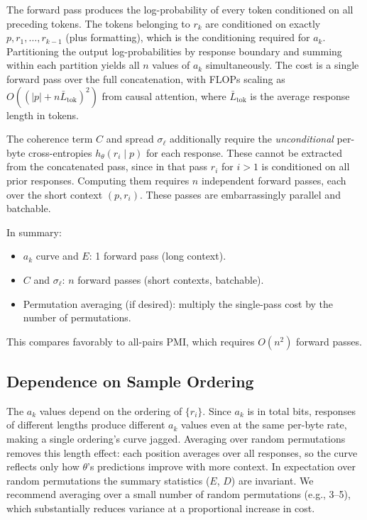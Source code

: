 \documentclass[11pt]{article}
\begin{document}
The forward pass produces the log-probability of every token conditioned on all preceding tokens. The tokens belonging to $r_k$ are conditioned on exactly $p, r_1, \ldots, r_{k-1}$ (plus formatting), which is the conditioning required for $a_k$. Partitioning the output log-probabilities by response boundary and summing within each partition yields all $n$ values of $a_k$ simultaneously. The cost is a single forward pass over the full concatenation, with FLOPs scaling as $O((|p| + n\bar{L}_{\mathrm{tok}})^2)$ from causal attention, where $\bar{L}_{\mathrm{tok}}$ is the average response length in tokens.

The coherence term $C$ and spread $\sigma_\ell$ additionally require the \emph{unconditional} per-byte cross-entropies $h_\theta(r_i \mid p)$ for each response. These cannot be extracted from the concatenated pass, since in that pass $r_i$ for $i > 1$ is conditioned on all prior responses. Computing them requires $n$ independent forward passes, each over the short context $(p, r_i)$. These passes are embarrassingly parallel and batchable.

In summary:
\begin{itemize}[nosep]
    \item $a_k$ curve and $E$: 1 forward pass (long context).
    \item $C$ and $\sigma_\ell$: $n$ forward passes (short contexts, batchable).
    \item Permutation averaging (if desired): multiply the single-pass cost by the number of permutations.
\end{itemize}

This compares favorably to all-pairs PMI, which requires $O(n^2)$ forward passes.

\subsection{Dependence on Sample Ordering}\label{sec:ordering}

The $a_k$ values depend on the ordering of $\{r_i\}$. Since $a_k$ is in total bits, responses of different lengths produce different $a_k$ values even at the same per-byte rate, making a single ordering's curve jagged. Averaging over random permutations removes this length effect: each position averages over all responses, so the curve reflects only how $\theta$'s predictions improve with more context. In expectation over random permutations the summary statistics ($E$, $D$) are invariant. We recommend averaging over a small number of random permutations (e.g., 3--5), which substantially reduces variance at a proportional increase in cost.
\end{document}
